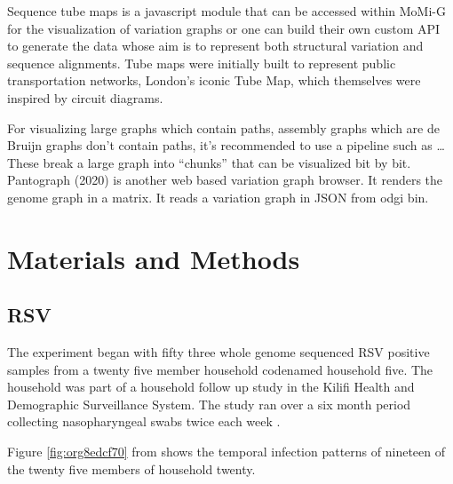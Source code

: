 \documentclass[10pt, a4paper]{article}
\begin{document}
Sequence tube maps \cite{beyerSequenceTubeMaps2019} is a javascript module that
can be accessed within MoMi-G for the visualization of variation graphs or one
can  build their own custom API to generate the data whose aim is to represent
both structural variation and sequence alignments.
Tube maps were initially built to represent public transportation networks,
London’s iconic Tube Map, \cite{cartwrightamBeckRepresentationLondon2012} which
themselves were inspired by circuit diagrams.

For visualizing large graphs which contain paths, assembly graphs which are de
Bruijn graphs don’t contain paths, it’s recommended to use a pipeline such as …
These break a large graph into “chunks” that can be visualized bit by bit.
Pantograph (2020) is another web based variation graph browser.
It renders the genome graph in a matrix. It reads a variation graph in JSON from
odgi bin.


\newpage
\section{Materials and Methods}
\label{sec:org40b305f}
\subsection{RSV}
\label{sec:orgb38f1f5}
The experiment began with fifty three whole genome sequenced RSV positive
samples from a twenty five member household codenamed household five.
The household was part of a household follow up study in the Kilifi Health and 
Demographic Surveillance System.
The study ran over a six month period collecting nasopharyngeal swabs twice each
week \cite{munywokiInfluenceAgeSeverity2015,agotiTransmissionPatternsEvolution2017,githinjiAssessingUtilityMinority2018}.

Figure \ref{fig:org8edcf70} from
\cite{githinjiAssessingUtilityMinority2018} shows the temporal infection patterns
of nineteen of the twenty five members of household twenty.
\end{document}

